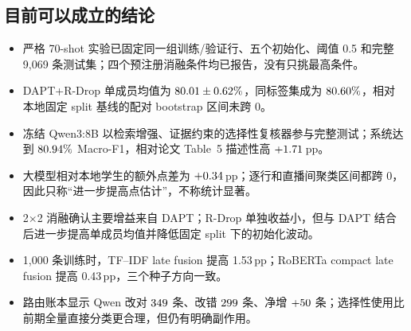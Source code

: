 \documentclass[UTF8,zihao=-4,a4paper]{ctexart}
\newcommand{\pp}{\,pp}
\begin{document}
\subsection{目前可以成立的结论}
\begin{itemize}[leftmargin=2em,itemsep=0.3em]
  \item 严格 70-shot 实验已固定同一组训练/验证行、五个初始化、阈值 0.5 和完整 9,069 条测试集；四个预注册消融条件均已报告，没有只挑最高条件。
  \item DAPT+R-Drop 单成员均值为 $80.01\pm0.62\%$，同标签集成为 $80.60\%$，相对本地固定 split 基线的配对 bootstrap 区间未跨 0。
  \item 冻结 Qwen3:8B 以检索增强、证据约束的选择性复核器参与完整测试；系统达到 $80.94\%$ Macro-F1，相对论文 Table~5 描述性高 $+1.71$\pp。
  \item 大模型相对本地学生的额外点差为 $+0.34$\pp；逐行和直播间聚类区间都跨 0，因此只称“进一步提高点估计”，不称统计显著。
  \item 2$\times$2 消融确认主要增益来自 DAPT；R-Drop 单独收益小，但与 DAPT 结合后进一步提高单成员均值并降低固定 split 下的初始化波动。
  \item 1,000 条训练时，TF--IDF late fusion 提高 1.53\pp；RoBERTa compact late fusion 提高 0.43\pp，三个种子方向一致。
  \item 路由账本显示 Qwen 改对 $349$ 条、改错 $299$ 条、净增 $+50$ 条；选择性使用比前期全量直接分类更合理，但仍有明确副作用。
\end{itemize}
\end{document}
